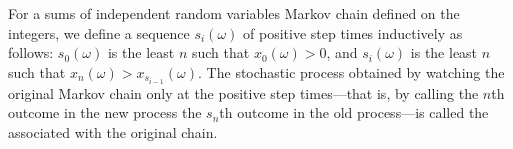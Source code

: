 For a sums of independent random variables Markov chain defined on the integers, we define a sequence $s_i(\omega)$ of positive step times inductively as follows: $s_0(\omega)$ is the least $n$ such that $x_0(\omega) > 0$, and $s_i(\omega)$ is the least $n$ such that $x_n(\omega) > x_{s_{i-1}}(\omega)$. The stochastic process obtained by watching the original Markov chain only at the positive step times---that is, by calling the $n$th outcome in the new process the $s_n$th outcome in the old process---is called the  associated with the original chain.
